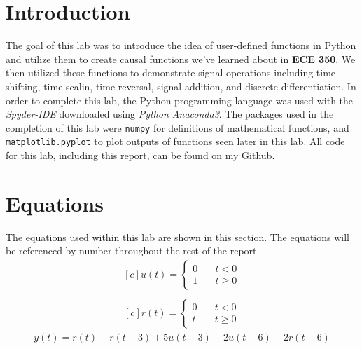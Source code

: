 \documentclass[12pt]{report}
\begin{document}
\section{Introduction}
The goal of this lab was to introduce the idea of user-defined functions in Python and utilize them to create causal functions we've learned about in \textbf{ECE 350}.
We then utilized these functions to demonstrate signal operations including time shifting, time scalin, time reversal, signal addition, and discrete-differentiation.
In order to complete this lab, the Python programming language was used with the \textit{Spyder-IDE} downloaded using \textit{Python Anaconda3}. The packages used in the 
completion of this lab were \texttt{numpy} for definitions of mathematical functions, and \texttt{matplotlib.pyplot} to plot outputs of functions seen later in this lab. 
All code for this lab, including this report, can be found on \href{http://github.com/mac-edmondson}{my Github}.
\section{Equations}
The equations used within this lab are shown in this section. The equations will be referenced by number throughout the rest of the report.
\begin{equation}\label{eq: 1}
  \begin{aligned}[c]
    u(t) = \left\{
      \begin{array}{ll}
        0 & \quad t < 0 \\
        1 & \quad t \geq 0
      \end{array}
    \right.\\
  \end{aligned}
\end{equation}
\begin{equation}\label{eq: 2}
  \begin{aligned}[c]
    r(t) = \left\{
      \begin{array}{ll}
        0 & \quad t < 0 \\
        t & \quad t \geq 0
      \end{array}
    \right.
  \end{aligned}
\end{equation}
\begin{equation}\label{eq: 3}
  \begin{aligned}
    y(t) = r(t) - r(t-3) + 5u(t-3) - 2u(t-6) - 2r(t-6)
  \end{aligned}
\end{equation}
\end{document}
